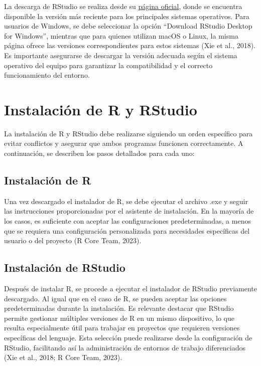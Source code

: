 \documentclass[
  spanish,
  a4paper,
  DIV=11,
  numbers=noendperiod,
  onepage,
  openany]{scrreprt}
\begin{document}
La descarga de RStudio se realiza desde su
\href{https://posit.co/download/rstudio-desktop/}{página oficial}, donde
se encuentra disponible la versión más reciente para los principales
sistemas operativos. Para usuarios de Windows, se debe seleccionar la
opción ``Download RStudio Desktop for Windows'', mientras que para
quienes utilizan macOS o Linux, la misma página ofrece las versiones
correspondientes para estos sistemas (Xie et al., 2018). Es importante
asegurarse de descargar la versión adecuada según el sistema operativo
del equipo para garantizar la compatibilidad y el correcto
funcionamiento del entorno.

\section{Instalación de R y
RStudio}\label{instalaciuxf3n-de-r-y-rstudio}

La instalación de R y RStudio debe realizarse siguiendo un orden
específico para evitar conflictos y asegurar que ambos programas
funcionen correctamente. A continuación, se describen los pasos
detallados para cada uno:

\subsection{Instalación de R}\label{instalaciuxf3n-de-r}

Una vez descargado el instalador de R, se debe ejecutar el archivo .exe
y seguir las instrucciones proporcionadas por el asistente de
instalación. En la mayoría de los casos, es suficiente con aceptar las
configuraciones predeterminadas, a menos que se requiera una
configuración personalizada para necesidades específicas del usuario o
del proyecto (R Core Team, 2023).

\subsection{Instalación de RStudio}\label{instalaciuxf3n-de-rstudio}

Después de instalar R, se procede a ejecutar el instalador de RStudio
previamente descargado. Al igual que en el caso de R, se pueden aceptar
las opciones predeterminadas durante la instalación. Es relevante
destacar que RStudio permite gestionar múltiples versiones de R en un
mismo dispositivo, lo que resulta especialmente útil para trabajar en
proyectos que requieren versiones específicas del lenguaje. Esta
selección puede realizarse desde la configuración de RStudio,
facilitando así la administración de entornos de trabajo diferenciados
(Xie et al., 2018; R Core Team, 2023).
\end{document}
